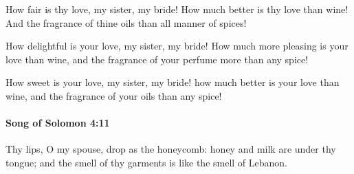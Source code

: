 			\begin{versebox}
					\item[BHS] 
					\item[LXX] 
					\item[ASV] How fair is thy love, my sister, my bride! How much better is thy love than wine! And the fragrance of thine oils than all manner of spices!
					\item[NIV] How delightful is your love, my sister, my bride! How much more pleasing is your love than wine, and the fragrance of your perfume more than any spice!
					\item[NRSV] How sweet is your love, my sister, my bride! how much better is your love than wine, and the fragrance of your oils than any spice!
			\end{versebox}

		\paragraph{Song of Solomon 4:11} %
			\label{SONGOFSOLOMON-4-11}

			Thy lips, O my spouse, drop as the honeycomb: honey and milk are under thy tongue; and the smell of thy garments is like the smell of Lebanon.

